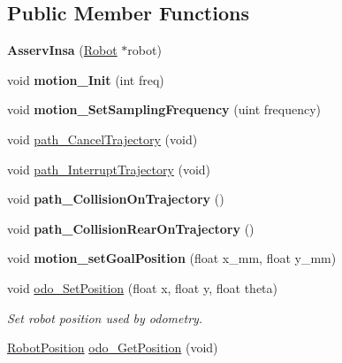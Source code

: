 \subsection*{Public Member Functions}
\begin{DoxyCompactItemize}
\item 
\mbox{\label{classAsservInsa_a373bbd394cf10d26734006ccfc9f795e}} 
{\bfseries Asserv\+Insa} (\hyperlink{classRobot}{Robot} $\ast$robot)
\item 
\mbox{\label{classAsservInsa_a72e39b2d5575c185d3058a1efb6ab950}} 
void {\bfseries motion\+\_\+\+Init} (int freq)
\item 
\mbox{\label{classAsservInsa_a799de6d34a2a87fb8e4c90c78aeaf96d}} 
void {\bfseries motion\+\_\+\+Set\+Sampling\+Frequency} (uint frequency)
\item 
void \hyperlink{classAsservInsa_a81c2ebb47e4d076df72b46dda9798828}{path\+\_\+\+Cancel\+Trajectory} (void)
\item 
void \hyperlink{classAsservInsa_aef3d84dbdf3cf625978f25554202369e}{path\+\_\+\+Interrupt\+Trajectory} (void)
\item 
\mbox{\label{classAsservInsa_a0e45f168261924d9ad7d4afc4e6819d1}} 
void {\bfseries path\+\_\+\+Collision\+On\+Trajectory} ()
\item 
\mbox{\label{classAsservInsa_af8a744352b442f246e689e2864caf23a}} 
void {\bfseries path\+\_\+\+Collision\+Rear\+On\+Trajectory} ()
\item 
\mbox{\label{classAsservInsa_afdaf455f758b81ee14f68af7a26fdf38}} 
void {\bfseries motion\+\_\+set\+Goal\+Position} (float x\+\_\+mm, float y\+\_\+mm)
\item 
\mbox{\label{classAsservInsa_a0a0e525f7c85b70e4643fd48a847da1e}} 
void \hyperlink{classAsservInsa_a0a0e525f7c85b70e4643fd48a847da1e}{odo\+\_\+\+Set\+Position} (float x, float y, float theta)
\begin{DoxyCompactList}\small\item\em Set robot position used by odometry. \end{DoxyCompactList}\item 
\hyperlink{structRobotPosition}{Robot\+Position} \hyperlink{classAsservInsa_ad3ba1c750cbefac429d6901b579a61a8}{odo\+\_\+\+Get\+Position} (void)

\end{DoxyCompactItemize}
